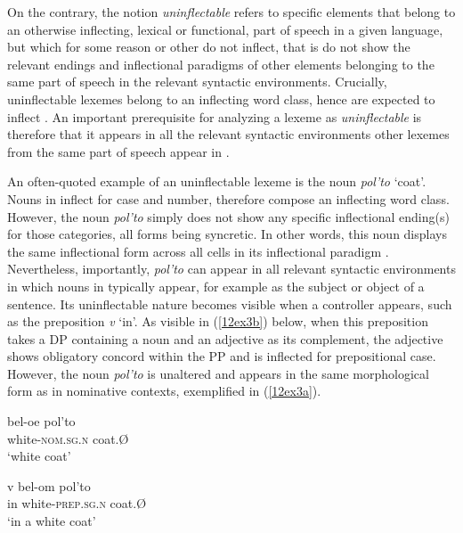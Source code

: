 \documentclass[output=paper,colorlinks,citecolor=brown]{langscibook}
\begin{document}
On the contrary, the notion \textit{uninflectable} refers to specific elements that belong to an otherwise inflecting, lexical or functional, part of speech in a given language, but which for some reason or other do not inflect, that is do not show the relevant endings and inflectional paradigms of other elements belonging to the same part of speech in the relevant syntactic environments. Crucially, uninflectable lexemes belong to an inflecting word class, hence are expected to inflect \citep[142]{spencer2020}. An important prerequisite for analyzing a lexeme as \emph{uninflectable} is therefore that it appears in all the relevant syntactic environments other lexemes from the same part of speech appear in \citep[142--144]{spencer2020}.

An often-quoted example of an uninflectable lexeme is the  noun \emph{pol'to} `coat'. Nouns in  inflect for case and number, therefore compose an inflecting word class. However, the noun \emph{pol'to} simply does not show any specific inflectional ending(s) for those categories, all forms being syncretic. In other words,  this noun displays the same inflectional form across all cells in its inflectional paradigm \citep[30]{baermanbrowncorbett2005}. Nevertheless, importantly, \emph{pol'to} can appear in all relevant syntactic environments in which nouns in  typically appear, for example as the subject or object of a sentence. Its uninflectable nature becomes visible when a controller appears, such as the preposition \emph{v} `in'. As visible in (\ref{12ex3b}) below, when this preposition takes a DP containing a noun and an adjective as its complement, the adjective shows obligatory concord within the PP and is inflected for prepositional case. However, the noun \emph{pol'to} is unaltered and appears in the same morphological form as in nominative contexts, exemplified in (\ref{12ex3a}).

\begin{exe}
	\ex \label{12ex3}
	\begin{xlist}
		\ex \label{12ex3a}
		\gll bel-oe pol’to \\
		white-\textsc{nom.sg.n} coat.Ø \\
		\trans `white coat’
		
		\ex \label{12ex3b}
		\gll v bel-om pol’to \\
		in white-\textsc{prep.sg.n} coat.Ø \\
		\trans `in a white coat’
	\end{xlist}
\end{exe}
\end{document}
